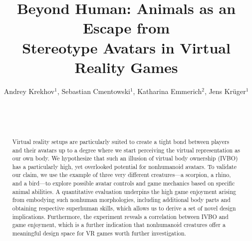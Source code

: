 \documentclass{sigchi}
\def\plaintitle{Beyond Human: Animals as an Escape from \\ Stereotype Avatars in Virtual Reality Games}
\begin{document}

\title{\plaintitle}

\author{
  \alignauthor Andrey Krekhov$^{1}$, Sebastian Cmentowski$^{1}$, Katharina Emmerich$^{2}$, Jens Kr\"uger$^{1}$ \\
    \\
    \\
    \\
  }


\maketitle

\begin{abstract}



Virtual reality setups are particularly suited to create a tight bond between players and their avatars up to a degree where we start perceiving the virtual representation as our own body. We hypothesize that such an illusion of virtual body ownership (IVBO) has a particularly high, yet overlooked potential for nonhumanoid avatars. To validate our claim, we use the example of three very different creatures---a scorpion, a rhino, and a bird---to explore possible avatar controls and game mechanics based on specific animal abilities. A quantitative evaluation underpins the high game enjoyment arising from embodying such nonhuman morphologies, including additional body parts and obtaining respective superhuman skills, which allows us to derive a set of novel design implications. Furthermore, the experiment reveals a correlation between IVBO and game enjoyment, which is a further indication that nonhumanoid creatures offer a meaningful design space for VR games worth further investigation.


\end{abstract}
\end{document}
